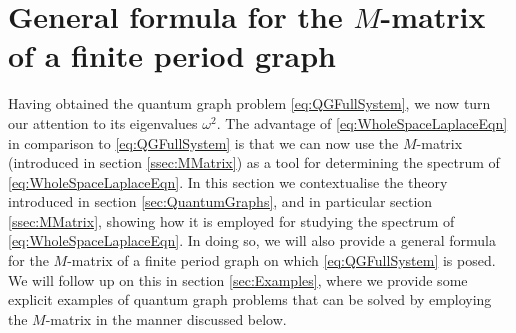 \section{General formula for the $M$-matrix of a finite period graph} \label{sec:Discussion}
Having obtained the quantum graph problem \eqref{eq:QGFullSystem}, we now turn our attention to its eigenvalues $\omega^2$.
The advantage of \eqref{eq:WholeSpaceLaplaceEqn} in comparison to \eqref{eq:QGFullSystem} is that we can now use the $M$-matrix (introduced in section \ref{ssec:MMatrix}) as a tool for determining the spectrum of \eqref{eq:WholeSpaceLaplaceEqn}.
In this section we contextualise the theory introduced in section \ref{sec:QuantumGraphs}, and in particular section \ref{ssec:MMatrix}, showing how it is employed for studying the spectrum of \eqref{eq:WholeSpaceLaplaceEqn}.
In doing so, we will also provide a general formula for the $M$-matrix of a finite period graph on which \eqref{eq:QGFullSystem} is posed.
We will follow up on this in section \ref{sec:Examples}, where we provide some explicit examples of quantum graph problems that can be solved by employing the $M$-matrix in the manner discussed below.

